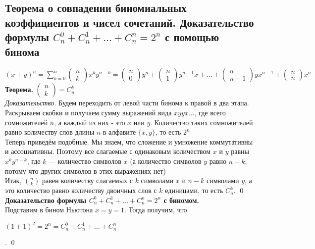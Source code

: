 \documentclass[a4paper]{article}
\begin{document}
\subsection{Теорема о совпадении биномиальных коэффициентов и чисел сочетаний. Доказательство формулы $C^0_n+C^1_n+\ldots+C^n_n=2^n$ с помощью бинома}
 $(x+y)^n=\sum\limits_{k=0}^n \begin{pmatrix}
    n\\
    k
\end{pmatrix}x^ky^{n-k}=\begin{pmatrix}
    n\\
    0
\end{pmatrix}y^n+\begin{pmatrix}
    n\\
    1
\end{pmatrix}y^{n-1}x+\ldots+\begin{pmatrix}
    n\\
    n-1
\end{pmatrix}yx^{n-1}+\begin{pmatrix}
    n\\
    n
\end{pmatrix}x^n$\\[2mm]
\textbf{Теорема.} $\begin{pmatrix}
    n\\
    k
\end{pmatrix}=C_n^k$\\[2mm]
\textit{Доказательство.} Будем переходить от левой части бинома к правой в два этапа. Раскрываем скобки и получаем сумму выражений вида $xyyx\ldots$, где всего сомножителей $n$, а каждый из них - это $x$ или $y$. Количество таких сомножителей равно количеству слов длины $n$ в алфавите $\{x,y\}$, то есть $2^n$\\[2mm]
 Теперь приведём подобные. Мы знаем, что сложение и умножение коммутативны и ассоциативны. Поэтому все слагаемые с одинаковым количеством $x$ и $y$ равны $x^ky^{n-k}$, где $k$ — количество символов $x$ (а количество символов $y$ равно $n-k$, потому что других символов в этих выражениях нет)\\[2mm]
 Итак, $\binom{n}{k}$ равен количеству слагаемых с $k$ символами $x$ и $n-k$ символами $y$, а это количество равно количеству двоичных слов с $k$ единицами, то есть $C_n^k$. \qed\\[2mm]
\textbf{Доказательство формулы $C^0_n+C^1_n+\ldots+C^n_n=2^n$ с биномом.}\\[2mm]
Подставим в бином Ньютона $x = y = 1$. Тогда получим, что\\
 \centerline{$(1+1)^2=2^n=C_n^0+C_n^1+\ldots+C_n^n$}. \qed
\end{document}
